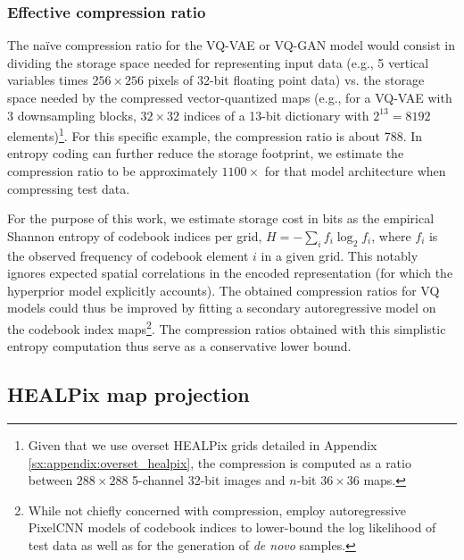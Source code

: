 \documentclass[11pt, a4paper, logo, copyright, numbering]{googledeepmind}
\begin{document}
\subsubsection{Effective compression ratio}

The na\"ive compression ratio for the VQ-VAE or VQ-GAN model would consist in dividing the storage space needed for representing input data (e.g., 5 vertical variables times $256 \times 256$ pixels of 32-bit floating point data) vs. the storage space needed by the compressed vector-quantized maps (e.g., for a VQ-VAE with 3 downsampling blocks, $32 \times 32$ indices of a 13-bit dictionary with $2^{13} = 8192$ elements)\footnote{Given that we use overset HEALPix grids detailed in Appendix \ref{sx:appendix:overset_healpix}, the compression is computed as a ratio between $288 \times 288$ 5-channel 32-bit images and $n$-bit $36 \times 36$ maps.}. For this specific example, the compression ratio is about 788. In entropy coding can further reduce the storage footprint, we estimate the compression ratio to be approximately $1100\times$ for that model architecture when compressing test data.

For the purpose of this work, we estimate storage cost in bits as the empirical Shannon entropy of codebook indices per grid, $H = -\sum_i f_i \log_2 f_i$, where $f_i$ is the observed frequency of codebook element $i$ in a given grid. 
This notably ignores expected spatial correlations in the encoded representation (for which the hyperprior model explicitly accounts). The obtained compression ratios for VQ models could thus be improved by fitting a secondary autoregressive model on the codebook index maps\footnote{While not chiefly concerned with compression, \cite{oord2017vqvae} employ autoregressive PixelCNN models of codebook indices to lower-bound the log likelihood of test data as well as for the generation of \emph{de novo} samples.}. The compression ratios obtained with this simplistic entropy computation thus serve as a conservative lower bound.

\subsection{HEALPix map projection}
\end{document}
